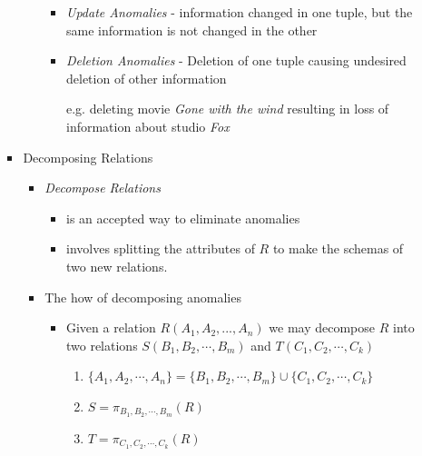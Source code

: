 \documentclass[12pt]{article}
\begin{document}
\begin{enumerate}[1.]
\begin{enumerate}[a)]
\begin{itemize}
\begin{itemize}
\begin{itemize}
                    \item \textit{Update Anomalies} - information changed in one
                    tuple, but the same information is not changed in the other

                    \item \textit{Deletion Anomalies} - Deletion of one tuple causing
                    undesired deletion of other information

                    \bigskip

                    e.g. deleting movie \textit{Gone with the wind} resulting
                    in loss of information about studio \textit{Fox}


                \end{itemize}
            \end{itemize}

            \item Decomposing Relations
            \begin{itemize}
                \item \textit{Decompose Relations}
                \begin{itemize}
                    \item is an accepted way to eliminate anomalies
                    \item involves splitting the attributes of $R$ to make the schemas of two new relations.
                \end{itemize}
                \item The how of decomposing anomalies
                \begin{itemize}
                    \item Given a relation $R(A_1,A_2,...,A_n)$ we may decompose
                    $R$ into two relations $S(B_1, B_2, \cdots, B_m)$ and $T(C_1, C_2, \cdots, C_k)$

                    \bigskip

                    \begin{enumerate}[1.]
                        \item $\{A_1, A_2, \cdots, A_n\} = \{B_1, B_2, \cdots, B_m\} \cup \{C_1,C_2, \cdots, C_k\}$
                        \item $S = \pi_{B_1, B_2, \cdots, B_m}(R)$
                        \item $T = \pi_{C_1, C_2, \cdots, C_k}(R)$
                    \end{enumerate}


\end{itemize}
\end{itemize}
\end{itemize}
\end{enumerate}
\end{enumerate}
\end{document}
